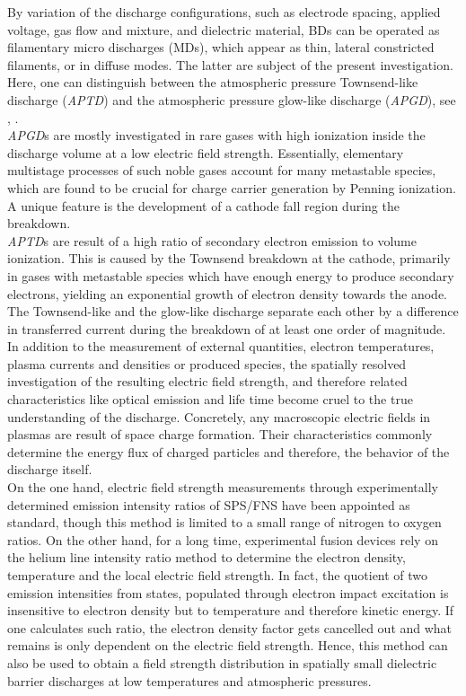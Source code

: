 \documentclass[a4paper,10pt,twoside]{article}
\newcommand{\tilt}[1]{\textit{#1}}
\begin{document}
		
		By variation of the discharge configurations, such as electrode spacing, applied voltage, gas flow and mixture, and dielectric material, BDs can be operated as filamentary micro discharges (MDs), which appear as thin, lateral constricted filaments, or in diffuse modes. The latter are subject of the present investigation. Here, one can distinguish between the atmospheric pressure Townsend-like discharge (\tilt{APTD}) and the atmospheric pressure glow-like discharge (\tilt{APGD}), see \cite{Massines2009}, \cite{Massines}.\\
		\tilt{APGD}s are mostly investigated in rare gases with high ionization inside the discharge volume at a low electric field strength. Essentially, elementary multistage processes of such noble gases account for many metastable species, which are found to be crucial for charge carrier generation by Penning ionization. A unique feature is the development of a cathode fall region during the breakdown.\\		
		\tilt{APTD}s are result of a high ratio of secondary electron emission to volume ionization. This is caused by the Townsend breakdown at the cathode, primarily in gases with metastable species which have enough energy to produce secondary electrons, yielding an exponential growth of electron density towards the anode.\\
		The Townsend-like and the glow-like discharge separate each other by a difference in transferred current during the breakdown of at least one order of magnitude. In addition to the measurement of external quantities, electron temperatures, plasma currents and densities or produced species, the spatially resolved investigation of the resulting electric field strength, and therefore related characteristics like optical emission and life time become cruel to the true understanding of the discharge. Concretely, any macroscopic electric fields in plasmas are result of space charge formation. Their characteristics commonly determine the energy flux of charged particles and therefore, the behavior of the discharge itself. \\
		On the one hand, electric field strength measurements through experimentally determined emission intensity ratios of SPS/FNS have been appointed as standard, though this method is limited to a small range of nitrogen to oxygen ratios. On the other hand, for a long time, experimental fusion devices rely on the helium line intensity ratio method to determine the electron density, temperature and the local electric field strength. In fact, the quotient of two emission intensities from states, populated through electron impact excitation is insensitive to electron density but to temperature and therefore kinetic energy. If one calculates such ratio, the electron density factor gets cancelled out and what remains is only dependent on the electric field strength. Hence, this method can also be used to obtain a field strength distribution in spatially small dielectric barrier discharges at low temperatures and atmospheric pressures.\\
\end{document}
